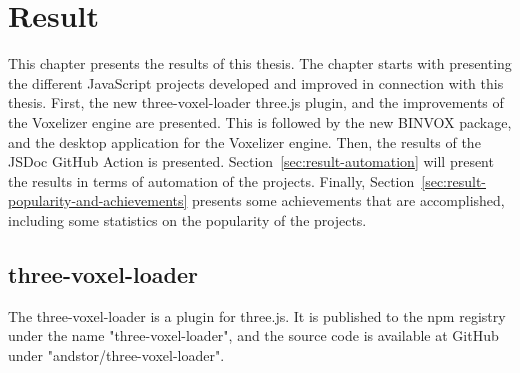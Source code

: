 \chapter{Result}
This chapter presents the results of this thesis. The chapter starts with presenting the different JavaScript projects developed and improved in connection with this thesis. First, the new three-voxel-loader three.js plugin, and the improvements of the Voxelizer engine are presented. This is followed by the new BINVOX package, and the desktop application for the Voxelizer engine. Then, the results of the JSDoc GitHub Action is presented. Section~\ref{sec:result-automation} will present the results in terms of automation of the projects. Finally, Section~\ref{sec:result-popularity-and-achievements} presents some achievements that are accomplished, including some statistics on the popularity of the projects.

\section{three-voxel-loader}
The three-voxel-loader is a plugin for three.js. It is published to the npm registry under the name "three-voxel-loader", and the source code is available at GitHub under "andstor/three-voxel-loader".

